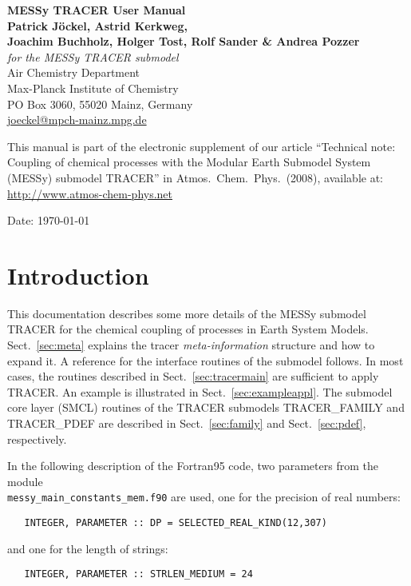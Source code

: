 \documentclass[twoside]{article}
\begin{document}
\thispagestyle{empty}
\begin{center}
  {\Huge\bf MESSy TRACER User Manual}\\[9mm]
  {\huge\bf Patrick J\"ockel, Astrid Kerkweg,}\\[3mm]
  {\huge\bf Joachim Buchholz, Holger Tost, Rolf Sander \& Andrea Pozzer}\\[9mm]
  {\huge\it for the MESSy TRACER submodel}\\[3mm]
  \Large
  Air Chemistry Department\\
  Max-Planck Institute of Chemistry\\
  PO Box 3060, 55020 Mainz, Germany\\
  \url{joeckel@mpch-mainz.mpg.de}

\end{center}

\vfill

{\large This manual is part of the electronic supplement of our article
``Technical note: Coupling of chemical processes with the Modular
Earth Submodel System (MESSy) submodel TRACER''
  in Atmos.\ Chem.\ Phys.\
  (2008), available at: \url{http://www.atmos-chem-phys.net}}

\begin{center}
  Date: \today
\end{center}

\newpage
\tableofcontents
\newpage

\section{Introduction}
%
This documentation describes some more details of the MESSy submodel TRACER
for the chemical coupling of processes in Earth System Models.
%
Sect.~\ref{sec:meta} explains the tracer {\it meta-information} structure 
and how to expand it.
%
A reference for the interface routines of the submodel follows.
%
In most cases, the routines described in Sect.~\ref{sec:tracermain} are
sufficient to apply TRACER.  An example is illustrated in
Sect.~\ref{sec:exampleappl}.
%
The submodel core layer (SMCL) routines of the TRACER submodels
TRACER\_FAMILY and TRACER\_PDEF are described in
Sect.~\ref{sec:family} and Sect.~\ref{sec:pdef}, respectively.

%
In the following description of the Fortran95 code, two parameters from
the module \\ {\tt messy\_main\_constants\_mem.f90} are used, one for the
precision of real numbers:
\begin{verbatim}
   INTEGER, PARAMETER :: DP = SELECTED_REAL_KIND(12,307)
\end{verbatim}
and one for the length of strings:
\begin{verbatim}
   INTEGER, PARAMETER :: STRLEN_MEDIUM = 24
\end{verbatim}
\end{document}
